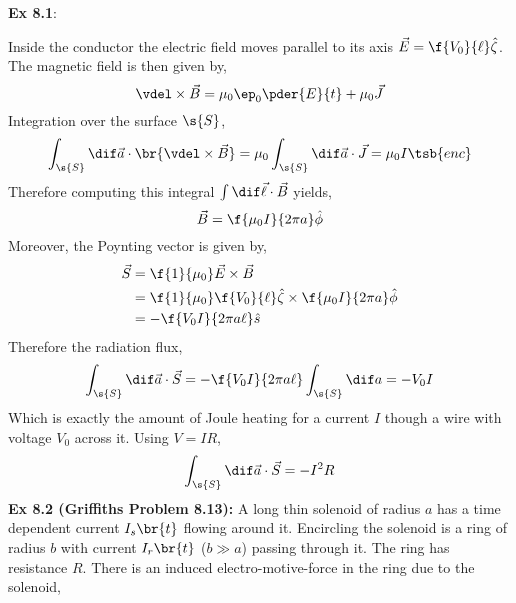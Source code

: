 \documentclass{article}
\begin{document}
\textbf{Ex 8.1}:
\begin{center}
\end{center}
Inside the conductor the electric field moves parallel to its axis $\vec{E} = \f{V_0}{\ell} \hat{\zeta}$. The magnetic field is then given by,
\[ \vdel \times \vec{B} = \mu_0 \ep_0 \pder{E}{t} + \mu_0 \vec{J} \]
Integration over the surface $\s{S}$,
\[ \int_{\s{S}} \dif \vec{a} \cdot \br{\vdel \times \vec{B}} = \mu_0 \int_{\s{S}} \dif \vec{a} \cdot \vec{J} = \mu_0 I\tsb{enc} \]
Therefore computing this integral $\int \dif \vec{\ell} \cdot \vec{B}$ yields,
\[ \vec{B} = \f{\mu_0I}{2\pi a}\hat{\phi} \]
Moreover, the Poynting vector is given by,
\begin{align*}
\vec{S} &= \f{1}{\mu_0} \vec{E}\times \vec{B} \\
&= \f{1}{\mu_0} \f{V_0}{\ell} \hat{\zeta} \times \f{\mu_0 I}{2 \pi a} \hat{\phi} \\
&= -\f{V_0 I}{2\pi a \ell}\hat{s}
\end{align*}
Therefore the radiation flux,
\[ \int_{\s{S}} \dif \vec{a} \cdot \vec{S} = -\f{V_0 I}{2 \pi a \ell} \int_{\s{S}} \dif a = - V_0 I \]
Which is exactly the amount of Joule heating for a current $I$ though a wire with voltage $V_0$ across it. Using $V = I R$,
\[ \int_{\s{S}} \dif \vec{a} \cdot \vec{S} = -I^2 R \]
\textbf{Ex 8.2 (Griffiths Problem 8.13):}
A long thin solenoid of radius $a$ has a time dependent current $I_{s}\br{t}$ flowing around it. Encircling the solenoid is a ring of radius $b$ with current $I_{r}\br{t}$ ($b \gg a$) passing through it. The ring has resistance $R$. There is an induced electro-motive-force in the ring due to the solenoid,
\end{document}
